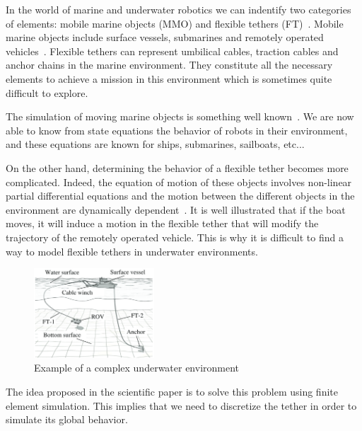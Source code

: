 In the world of marine and underwater robotics we can indentify two categories of elements: mobile marine objects (MMO) and flexible tethers (FT)~\cite{blintsov_development_2017}. Mobile marine objects include surface vessels, submarines and remotely operated vehicles~\cite{jaulin_mobile_2019}. Flexible tethers can represent umbilical cables, traction cables and anchor chains in the marine environment. They constitute all the necessary elements to achieve a mission in this environment which is sometimes quite difficult to explore.

The simulation of moving marine objects is something well known~\cite{ganoni_generalized_2018}. We are now able to know from state equations the behavior of robots in their environment, and these equations are known for ships, submarines, sailboats, etc...~\cite{jaulin_mobile_2019}

On the other hand, determining the behavior of a flexible tether becomes more complicated. Indeed, the equation of motion of these objects involves non-linear partial differential equations and the motion between the different objects in the environment are dynamically dependent~\cite{blintsov_development_2017}. It is well illustrated that if the boat moves, it will induce a motion in the flexible tether that will modify the trajectory of the remotely operated vehicle. This is why it is difficult to find a way to model flexible tethers in underwater environments.

\begin{figure}
	\centering
	\includegraphics[width=0.4\textwidth]{imgs/underwater_environment.png}
	\caption{Example of a complex underwater environment }
	\label{fig:underwater_environment}
\end{figure}

The idea proposed in the scientific paper is to solve this problem using finite element simulation. This implies that we need to discretize the tether in order to simulate its global behavior.